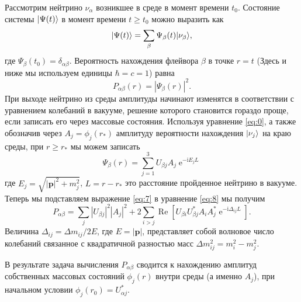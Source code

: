 \documentclass[a4paper,12pt]{article}
\newcommand\Vect[1]{{\boldsymbol{#1}}}
\renewcommand{\Re}{\operatorname{Re}}
\renewcommand{\exp}{\operatorname{e}}
\renewcommand{\imath}{\mathrm{i}}
\DeclarePairedDelimiter\ket{|}{\rangle}
\begin{document}
Рассмотрим нейтрино \(\nu_{\alpha}\) возникшее в среде в момент времени
\(t_{0}\). Состояние системы \(\ket{\Psi(t)}\) в момент времени \(t\geq t_{0}\)
можно выразить как
\begin{equation}
	\ket{\Psi(t)}=\sum_{\beta}\Psi_{\beta}(t)\ket{\nu_{\beta}},
\end{equation}
где \(\Psi_{\beta}(t_{0})=\delta_{\alpha\beta}\). Вероятность нахождения
флейвора \(\beta\) в точке \(r=t\) (Здесь и ниже мы используем единицы
\(\hbar=c=1\)) равна
\begin{equation}\label{eq:8}
	P_{\alpha\beta}(r)=|\Psi_{\beta}(r)|^{2}.
\end{equation}
При выходе нейтрино из среды амплитуды начинают изменятся в соответствии с
уравнением колебаний в вакууме, решение которого становится гораздо проще, если
записать его через массовые состояния. Используя уравнение \eqref{eq:0}, а также
обозначив через \(A_{j}=\phi_{j}(r_{*})\) амплитуду вероятности нахождения
\(\ket{\nu_{j}}\) на краю среды, при \(r\geq r_{*}\) мы можем записать
\begin{equation}\label{eq:7}
	\Psi_{\beta}(r)=\sum_{j=1}^{3}U_{\beta j}A_{j}\exp^{-\imath E_{j}L}
\end{equation}
где \(E_{j}=\sqrt{|\Vect{p}|^{2}+m_{j}^{2}}\), \(L=r-r_{*}\) это расстояние
пройденное нейтрино в вакууме. Теперь мы подставляем выражение \eqref{eq:7} в
уравнение \eqref{eq:8} мы получим
\begin{equation}
	P_{\alpha\beta}=\sum_{j}|U_{\beta j}|^{2}|A_{j}|^{2}+2\sum_{i>j}\Re[U_{\beta i}U_{\beta j}^{*}A_{i}A_{j}^{*}\exp^{-\imath\Delta_{ij}L}].
\end{equation}
Величина \(\Delta_{ij}=\Delta m_{ij}/2E\), где \(E=|\Vect{p}|\), представляет
собой волновое число колебаний связанное с квадратичной разностью масс
\(\Delta m_{ij}^{2}=m_{i}^{2}-m_{j}^{2}\).

В результате задача вычисления \(P_{\alpha\beta}\) сводится к нахождению
амплитуд собственных массовых состояний \(\phi_{j}(r)\) внутри среды (а именно
\(A_{j}\)), при начальном условии \(\phi_{j}(r_{0})=U_{\alpha j}^{*}\).
\end{document}
